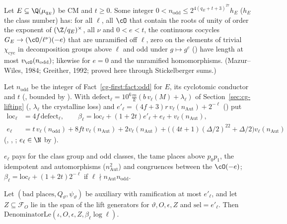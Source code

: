 \begin{fact}\label{cg-first:fact:odd}
Let $E\subseteq\Q(\mu_{q_E})$ be CM and $t\ge0$. Some integer $0<n_{\mathrm{odd}}\le2^{4(q_E+t+3)^{27}}h_E$ ($h_E$ the
class number) has: for all $\ell$, all $\cO$ that contain the roots of unity of order the exponent of
$(\Z/q_E)^\times$, all $\nu$ and $0<e<t$, the continuous cocycles
$G_E\to(\cO/\ell^\nu)(-e)$ that are unramified off $\ell$, zero on the elements of trivial
$\chi_{\mathrm{cyc}}$ in decomposition groups above $\ell$ and odd under $g\mapsto g^c$
() have length at most $v_\cO(n_{\mathrm{odd}})$; likewise for $e=0$ and the unramified
homomorphisms. (Mazur--Wiles, 1984; Greither, 1992; proved here through Stickelberger sums.)
\end{fact}

\begin{definition}\label{cg-first:def:constants}
Let $n_{\mathrm{odd}}$ be the integer of Fact~\ref{cg-first:fact:odd} for $E$, its cyclotomic conductor and $t$
(, bounded by ). With
$\mathrm{defect}_\ell=10^6\frac mk(b\,v_\ell(M)+\lambda_\ell)$ of Section~\ref{sec:cg-lifting}
(, $\lambda_\ell$ the crystalline loss) and $e'_\ell=(4f+3)r\,v_\ell(n_{\mathrm{Aut}})+2^{-\ell}$
() put
\begin{align*}
  \mathrm{loc}_\ell&=4f\,\mathrm{defect}_\ell,\qquad
  \beta_\ell=\mathrm{loc}_\ell+(1+2t)e'_\ell+e_\ell+v_\ell(n_{\mathrm{Aut}}),\\
  e_\ell&=t\,v_\ell(n_{\mathrm{odd}})+8ft\,v_\ell(n_{\mathrm{Aut}})+2v_\ell(n_{\mathrm{Aut}})+\bigl((4t+1)(\Delta/2)^{22}+\Delta/2\bigr)
  v_\ell(n_{\mathrm{Aut}})
\end{align*}
(, , ;
$e_\ell\in\N$ by ).
\end{definition}

$e_\ell$ pays for the class group and odd classes, the tame places above $p_0p_1$, the idempotent and
automorphisms ($n_{\mathrm{Aut}}^2$) and congruences between the $\cO(-e)$; $\beta_\ell=\mathrm{loc}_\ell+
(1+2t)2^{-\ell}$ if $\ell\nmid n_{\mathrm{Aut}}n_{\mathrm{odd}}$.

\begin{theorem}
\label{cg-first:thm:main}
Let $(\text{bad places},Q_\vartheta,\psi_\vartheta)$ be auxiliary with ramification at most $e'_\ell$,
and let $Z\subseteq\mathcal F_O$ lie in the span of the lift generators for $\vartheta,O,\epsilon,Z$
and $\mathrm{sel}=e'_\ell$. Then $\mathrm{DenominatorLe}(\iota,O,\epsilon,Z,\beta_\ell\log\ell)$.
\end{theorem}

